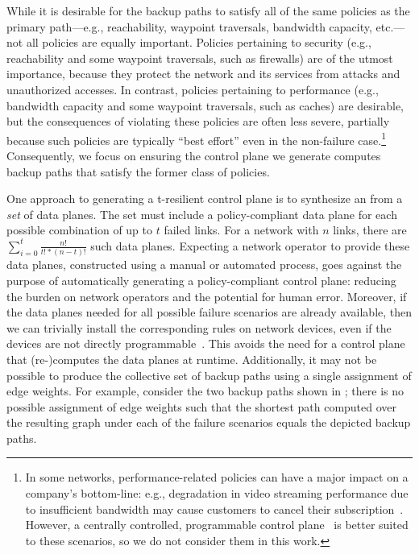 While it is desirable for the backup paths to satisfy all of the same policies
as the primary path---e.g., reachability, waypoint traversals, bandwidth
capacity, etc.---not all policies are equally important.  Policies pertaining
to security (e.g., reachability and some waypoint traversals, such as
firewalls) are of the utmost importance, because they protect the network and
its services from attacks and unauthorized accesses.  In contrast, policies
pertaining to performance (e.g., bandwidth capacity and some waypoint
traversals, such as caches) are desirable, but the consequences of violating
these policies are often less severe, partially because such policies are
typically ``best effort'' even in the non-failure case.\footnote{In some
networks, performance-related policies can have a major impact on a company's
bottom-line: e.g., degradation in video streaming performance due to
insufficient bandwidth may cause customers to cancel their
subscription~\cite{TBD}. However, a centrally controlled, programmable control
plane~\cite{swan, b4} is better suited to these scenarios, so we do not
consider them in this work.} Consequently, we focus on ensuring the control
plane we generate computes backup paths that satisfy the former class of
policies. 

One approach to generating a t-resilient control plane is to synthesize an
\ARC from a {\em set} of data planes. The set must include a policy-compliant
data plane for each possible combination of up to $t$ failed links. For a
network with $n$ links, there are $\sum_{i=0}^{t} \frac{n!}{t! * (n-t)!}$ such
data planes. Expecting a network operator to provide these data planes,
constructed using a manual or automated process, goes against the purpose of
automatically generating a policy-compliant control plane: reducing the burden
on network operators and the potential for human error. Moreover, if the data
planes needed for all possible failure scenarios are already available, then
we can trivially install the corresponding rules on network devices, even if
the devices are not directly programmable~\cite{TODO}. This avoids the need
for a control plane that (re-)computes the data planes at runtime.
Additionally, it may not be possible to produce the collective set of backup
paths using a single assignment of edge weights. For example, consider the two
backup paths shown in ; there is no possible assignment of
edge weights such that the shortest path computed over the resulting graph
under each of the failure scenarios equals the depicted backup paths.


